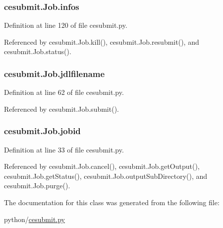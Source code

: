 \subsubsection[{infos}]{\setlength{\rightskip}{0pt plus 5cm}cesubmit.\-Job.\-infos}\label{classcesubmit_1_1Job_a040f59b13e8ffdbd9ef40aa8fc14c327}


Definition at line 120 of file cesubmit.\-py.



Referenced by cesubmit.\-Job.\-kill(), cesubmit.\-Job.\-resubmit(), and cesubmit.\-Job.\-status().

\subsubsection[{jdlfilename}]{\setlength{\rightskip}{0pt plus 5cm}cesubmit.\-Job.\-jdlfilename}\label{classcesubmit_1_1Job_a2b667da47389ffd8d97902da2080f3b3}


Definition at line 62 of file cesubmit.\-py.



Referenced by cesubmit.\-Job.\-submit().

\subsubsection[{jobid}]{\setlength{\rightskip}{0pt plus 5cm}cesubmit.\-Job.\-jobid}\label{classcesubmit_1_1Job_a65d1f01433276553979481396c9faadf}


Definition at line 33 of file cesubmit.\-py.



Referenced by cesubmit.\-Job.\-cancel(), cesubmit.\-Job.\-get\-Output(), cesubmit.\-Job.\-get\-Status(), cesubmit.\-Job.\-output\-Sub\-Directory(), and cesubmit.\-Job.\-purge().



The documentation for this class was generated from the following file\-:\begin{DoxyCompactItemize}
\item 
python/\hyperlink{cesubmit_8py}{cesubmit.\-py}\end{DoxyCompactItemize}
